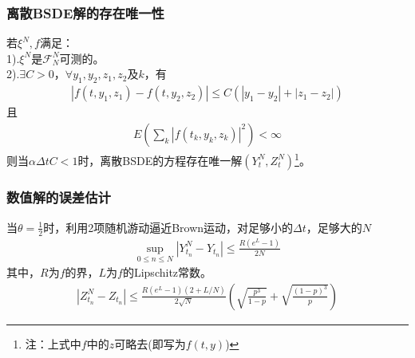 		\subsubsection{离散BSDE解的存在唯一性}
			若${\xi}^N,f$满足：\\
			1).${\xi}^N$是${{\mathcal{F}}_N^N}$可测的。\\
			2).$\exists C>0$，$\forall y_1,y_2,z_1,z_2$及$k$，有
			\begin{align*}
			\left| {f\left( {t,y_1,{z_1}} \right) - f\left( {t,y_2,{z_2}} \right)} \right| \leqslant C\left( {\left| {{y_1} - {y_2}} \right| + \left| {{z_1} - {z_2}} \right|} \right)
			\end{align*}
			且\begin{align*}
			E\left( {\sum\limits_k {{{\left| {f\left( {{t_k},{y_k},{z_k}} \right)} \right|}^2}} } \right) < \infty
			\end{align*}
			则当$\alpha \Delta tC <1$时，离散BSDE的方程存在唯一解$(Y_t^N,Z_t^N)$\footnote{注：上式中$f$中的$z$可略去(即写为$f(t,y)$)}。
		\subsubsection{数值解的误差估计}
			当$\theta=\frac 12$时，利用2项随机游动逼近Brown运动，对足够小的$\Delta t$，足够大的$N$
			\begin{align*}
			\mathop {\sup }\limits_{0 \leqslant n \leqslant N} \left| {Y_{{t_n}}^N - {Y_{{t_n}}}} \right| \leqslant \frac{{R\left( {{e^L} - 1} \right)}}{{2N}}
			\end{align*}
			其中，$R$为$f$的界，$L$为$f$的Lipschitz常数。
			\begin{align*}
			\left|Z_{t_n}^N - Z_{t_n}\right|\leqslant \frac{R(e^L-1)(2+L/N)}{2\sqrt{N}} \left(\sqrt{\frac{p^3}{1-p}}+\sqrt{\frac{(1-p)^3}{p}} \right)
			\end{align*}
